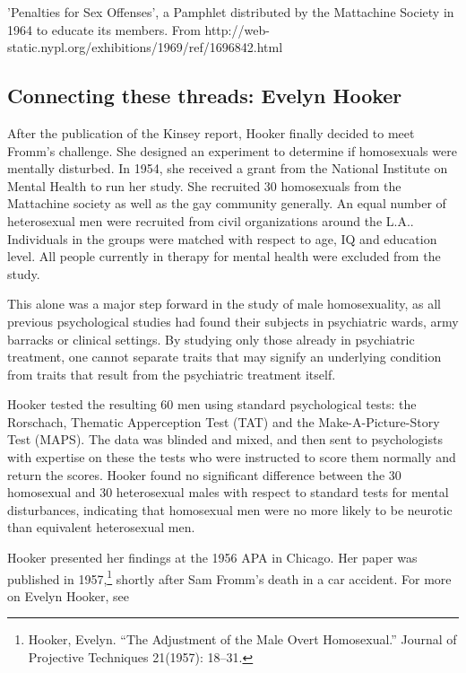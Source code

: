 \begin{refsection}
\begin{marginfigure}
\begin{center}
\end{center}
 \caption{'Penalties for Sex Offenses', a Pamphlet distributed by the Mattachine Society in 1964 to educate its members.  From http://web-static.nypl.org/exhibitions/1969/ref/1696842.html}
\label{fig: MattachinePamphlet}
\end{marginfigure}


\subsection{Connecting these threads: Evelyn Hooker}
\label{connectingthesethreads:evelynhooker}

After the publication of the Kinsey report, Hooker finally decided to meet Fromm's challenge. She designed an experiment to determine if homosexuals were mentally disturbed. In 1954, she received a grant from the National Institute on Mental Health to run her study. She recruited 30 homosexuals from the Mattachine society as well as the gay community generally. An equal number of heterosexual men were recruited from civil organizations around the L.A.. Individuals in the groups were matched with respect to age, IQ and education level. All people currently in therapy for mental health were excluded from the study. 

This alone was a major step forward in the study of male homosexuality, as all previous psychological studies had found their subjects in psychiatric wards, army barracks or clinical settings. By studying only those already in psychiatric treatment, one cannot separate traits that may signify an underlying condition from traits that result from the psychiatric treatment itself.

Hooker tested the resulting 60 men using standard psychological tests: the Rorschach, Thematic Apperception Test (TAT) and the Make-A-Picture-Story Test (MAPS). The data was blinded and mixed, and then sent to psychologists with expertise on these the tests who were instructed to score them normally and return the scores. Hooker found no significant difference between the 30 homosexual and 30 heterosexual males with respect to standard tests for mental disturbances, indicating that homosexual men were no more likely to be neurotic than equivalent heterosexual men.

Hooker presented her findings at the 1956 APA in Chicago. Her paper was published in 1957,\footnote{Hooker, Evelyn. ``The Adjustment of the Male Overt Homosexual.'' Journal of Projective Techniques 21(1957): 18--31.} shortly after Sam Fromm's death in a car accident. For more on Evelyn Hooker, see ~\citep{Aldrich:2005wq}


\end{refsection}
